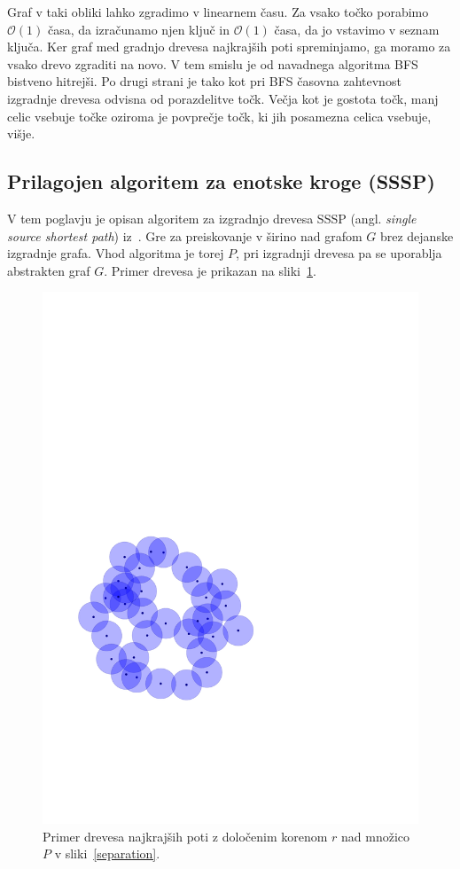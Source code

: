\documentclass[a4paper, 12pt]{book}
\newcommand{\OO}{\ensuremath{\mathcal{O}}} %
\begin{document}
Graf v taki obliki lahko zgradimo v linearnem času. Za vsako točko porabimo $\OO(1)$ časa, da izračunamo njen ključ in $\OO(1)$ časa, da jo vstavimo v seznam ključa. Ker graf med gradnjo drevesa najkrajših poti spreminjamo, ga moramo za vsako drevo zgraditi na novo. V tem smislu je od navadnega algoritma BFS bistveno hitrejši. Po drugi strani je tako kot pri BFS časovna zahtevnost izgradnje drevesa odvisna od porazdelitve točk. Večja kot je gostota točk, manj celic vsebuje točke oziroma je povprečje točk, ki jih posamezna celica vsebuje, višje.

\subsection{Prilagojen algoritem za enotske kroge (SSSP)}
\label{sssp-tree}
V tem poglavju je opisan algoritem za izgradnjo drevesa SSSP (angl. \textit{single source shortest path}) iz~\cite{CJ15}. Gre za preiskovanje v širino nad grafom $G$ brez dejanske izgradnje grafa. Vhod algoritma je torej $P$, pri izgradnji drevesa pa se uporablja abstrakten graf $G$. Primer drevesa je prikazan na sliki~\ref{sssp-tree-ex}.

\begin{figure}[htp]
\centerline{\includegraphics[scale=0.6,page=6]{pics/unitdisks.pdf}}
\caption{Primer drevesa najkrajših poti z določenim korenom $r$ nad množico $P$ v sliki~\ref{separation}.}
\label{sssp-tree-ex}
\end{figure}
\end{document}
